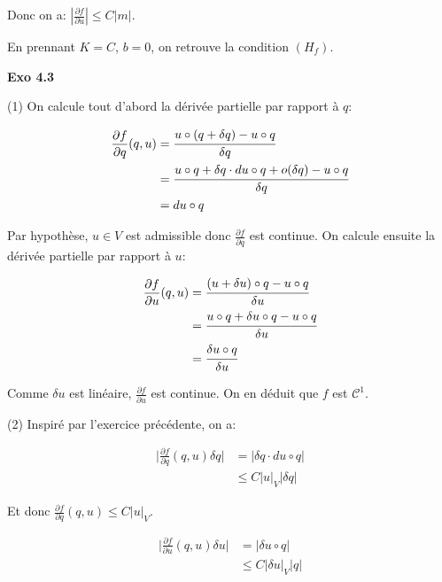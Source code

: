 \documentclass[11pt]{article}
\begin{document}
    Donc on a: $|\frac{\partial f}{\partial u}| \le C|m|$. 

    En prennant $K = C$, $b = 0$, on retrouve la condition $(H_f)$.

    \textbf{Exo 4.3} 

    (1) On calcule tout d'abord la dérivée partielle par rapport à $q$:

    \vspace{-4em}
    \begin{align*} 
      \frac{\partial f}{\partial q} (q, u) &= \cfrac{u \circ (q + \delta q) - u \circ q}{\delta q} \\
      &= \cfrac{u \circ q + \delta q \cdot du \circ q + o(\delta q) - u \circ q}{\delta q} \\
      &= du \circ q
    \end{align*}
    \vspace{-4em}

    Par hypothèse, $u \in V$ est admissible donc $\frac{\partial f}{\partial q}$ est continue. On calcule ensuite la dérivée partielle par rapport à $u$:

    \vspace{-4em}
    \begin{align*} 
      \frac{\partial f}{\partial u} (q, u) &= \cfrac{(u + \delta u)\circ q - u \circ q}{\delta u} \\
      &= \cfrac{u \circ q + \delta u \circ q - u \circ q}{\delta u} \\
      &= \cfrac{\delta u \circ q}{\delta u}
    \end{align*}
    \vspace{-4em}

    Comme $\delta u$ est linéaire, $\frac{\partial f}{\partial u}$ est continue. On en déduit que $f$ est $\mathscr{C}^1$.

    (2) Inspiré par l'exercice précédente, on a:

    \vspace{-4em}
    \begin{align*} 
      \Big |\frac{\partial f}{\partial q} (q, u) \delta q \Big | &= |\delta q \cdot du \circ q| \\
      & \le C |u|_V |\delta q|
    \end{align*}
    \vspace{-4em}

    Et donc $\frac{\partial f}{\partial q} (q, u) \le C |u|_V$.

    \vspace{-4em}
    \begin{align*} 
      \Big |\frac{\partial f}{\partial u} (q, u) \delta u \Big | &= |\delta u \circ q| \\
      & \le C |\delta u|_V |q|
    \end{align*}
    \vspace{-4em}
\end{document}
